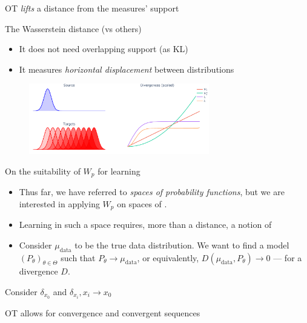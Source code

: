 \documentclass[pdf,aspectratio=169,10pt]{beamer}
\begin{document}
\begin{frame}{OT \emph{lifts} a distance from the measures' support}
\end{frame}

\begin{frame}{The Wasserstein distance (vs others)}
    \begin{itemize}
        \item It does not need overlapping support (as KL)
        \item It measures \emph{horizontal  displacement} between distributions
    \end{itemize}
    \begin{figure}
        \centering
            \includegraphics[trim={0 0 0 0},clip, width=0.7\textwidth]{../img/wasserstein_1d.pdf}
        \end{figure}
        \centering
        \small

\end{frame}

\begin{frame}{On the suitability of $W_p$ for learning}

\begin{itemize}
    \item Thus far, we have referred to \emph{spaces of probability functions}, but we are interested in applying $W_p$ on spaces of .
    \item Learning in such a space requires, more than a distance, a notion of 
    \item Consider $\mu_\text{data}$ to be the true data distribution. We want to find a model $(P_\theta)_{\theta\in\Theta}$ such that $P_\theta \to \mu_\text{data}$, or equivalently, $D(\mu_\text{data},P_\theta)\to 0$ --- for a  divergence $D$.
\end{itemize}
\vspace{2em}
\centerline{ Consider $\delta_{x_0}$ and $\delta_{x_i}, x_i\to x_0$}
\vspace{2em}

\centerline{OT allows for  convergence and  convergent sequences}

\end{frame}
\end{document}
